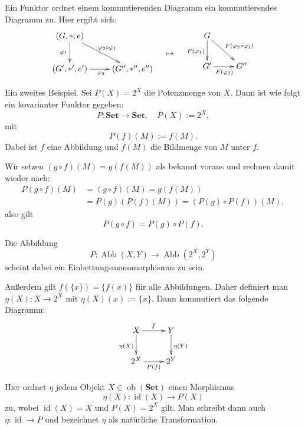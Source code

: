 \documentclass[9pt]{beamer}
\newcommand{\id}{\operatorname{id}}
\newcommand{\Abb}{\operatorname{Abb}}
\newcommand{\ob}{\operatorname{ob}}
\begin{document}
\begin{frame}
Ein Funktor ordnet einem kommutierenden Diagramm ein
kommutierendes Diagramm zu. Hier ergibt sich:
\[
\begin{matrix}\xymatrix{(G,*,e)\ar[d]_{\varphi_1} \ar[dr]^{\varphi_2\circ\varphi_1}\\
  (G',*',e')\ar[r]_{\varphi_2} & (G'',*'',e'')}\end{matrix}
\quad\mapsto\quad\begin{matrix}
\xymatrix{G\ar[d]_{F(\varphi_1)}\ar[dr]^{F(\varphi_2\circ\varphi_1)}\\
  G'\ar[r]_{F(\varphi_2)} & G''}\end{matrix}
\]
\end{frame}

\begin{frame}
Ein zweites Beispiel. Sei $P(X)=2^X$ die Potenzmenge von $X$.
Dann ist wie folgt ein kovarianter Funktor gegeben:
\[P\colon\mathbf{Set}\to\mathbf{Set},\quad P(X):=2^X,\]
mit
\[P(f)(M) := f(M).\]
Dabei ist $f$ eine Abbildung und $f(M)$ die Bildmenge von $M$
unter $f$.
\end{frame}

\begin{frame}
Wir setzen $(g\circ f)(M)=g(f(M))$ als bekannt voraus und rechnen
damit wieder nach:
\begin{align*}
P(g\circ f)(M) &= (g\circ f)(M) = g(f(M))\\
&= P(g)(P(f)(M)) = (P(g)\circ P(f))(M),
\end{align*}
also gilt
\[P(g\circ f) = P(g)\circ P(f).\]
\end{frame}

\begin{frame}
Die Abbildung
\[P\colon \Abb(X,Y)\to\Abb(2^X,2^Y)\]
scheint dabei ein Einbettungsmonomorphismus zu sein.
\end{frame}

\begin{frame}
Außerdem gilt $f(\{x\})=\{f(x)\}$ für alle Abbildungen. Daher definiert
man $\eta(X)\colon X\to 2^X$ mit $\eta(X)(x):=\{x\}$. Dann
kommutiert das folgende Diagramm:
\[\xymatrix{
X \ar[r]^f \ar[d]_{\eta(X)} & Y \ar[d]^{\eta(Y)} \\
2^X \ar[r]_{P(f)} & 2^Y }\]
\end{frame}

\begin{frame}
Hier ordnet $\eta$ jedem Objekt $X\in\ob(\mathbf{Set})$ einen Morphismus
\[\eta(X)\colon \id(X)\to P(X)\]
zu, wobei $\id(X)=X$ und $P(X)=2^X$ gilt. Man schreibt dann auch
$\eta\colon \id\to P$ und bezeichnet $\eta$ als natürliche
Transformation.
\end{frame}
\end{document}
